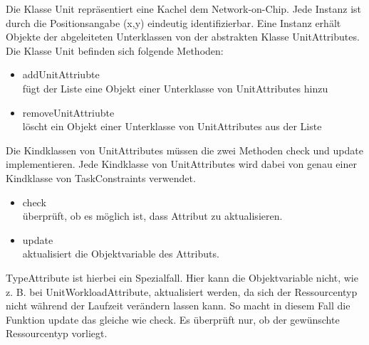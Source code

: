 Die Klasse Unit repräsentiert eine Kachel dem Network-on-Chip. Jede Instanz ist durch die Positionsangabe (x,y) eindeutig identifizierbar. Eine Instanz erhält Objekte der abgeleiteten Unterklassen von der abstrakten Klasse UnitAttributes. Die Klasse Unit befinden sich folgende Methoden:
\begin{itemize}
\item addUnitAttriubte\\
fügt der Liste eine Objekt einer Unterklasse von UnitAttributes hinzu
\item removeUnitAttriubte\\
löscht ein Objekt einer Unterklasse von UnitAttributes aus der Liste
\end{itemize}

Die Kindklassen von UnitAttributes müssen die zwei Methoden check und update implementieren. Jede Kindklasse von UnitAttributes wird dabei von genau einer Kindklasse von TaskConstraints verwendet.

\begin{itemize}
\item check\\
überprüft, ob es möglich ist, dass Attribut zu aktualisieren.
\item update \\
aktualisiert die Objektvariable des Attributs.
\end{itemize}


TypeAttribute ist hierbei ein Spezialfall. Hier kann die Objektvariable nicht, wie z. B. bei UnitWorkloadAttribute, aktualisiert werden, da sich der Ressourcentyp  nicht während der Laufzeit verändern lassen kann. So macht in diesem Fall die Funktion update das gleiche wie check. Es überprüft nur, ob der gewünschte Ressourcentyp vorliegt.


